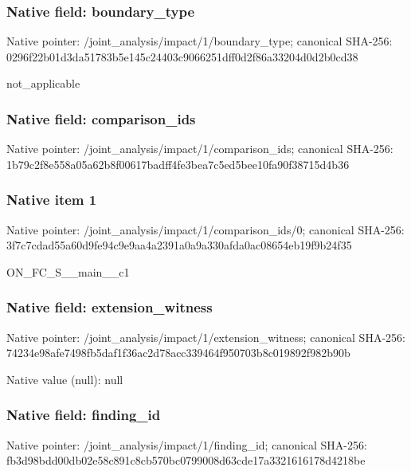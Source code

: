 \documentclass[10pt,a4paper]{article}
\begin{document}
\subsubsection{Native field: boundary\_\allowbreak{}type}
Native pointer: /joint\_\allowbreak{}analysis/impact/1/boundary\_\allowbreak{}type; canonical SHA-256: 0296f22b01d3da51783b5e145c24403c9066251dff0d2f86a33204d0d2b0cd38

\begingroup\raggedright\sloppy not\_\allowbreak{}applicable\par\endgroup

\subsubsection{Native field: comparison\_\allowbreak{}ids}
Native pointer: /joint\_\allowbreak{}analysis/impact/1/comparison\_\allowbreak{}ids; canonical SHA-256: 1b79c2f8e558a05a62b8f00617badff4fe3bea7c5ed5bee10fa90f38715d4b36

\subsubsection{Native item 1}
Native pointer: /joint\_\allowbreak{}analysis/impact/1/comparison\_\allowbreak{}ids/0; canonical SHA-256: 3f7c7cdad55a60d9fe94c9e9aa4a2391a0a9a330afda0ac08654eb19f9b24f35

\begingroup\raggedright\sloppy ON\_\allowbreak{}FC\_\allowbreak{}S\_\allowbreak{}\_\allowbreak{}main\_\allowbreak{}\_\allowbreak{}c1\par\endgroup

\subsubsection{Native field: extension\_\allowbreak{}witness}
Native pointer: /joint\_\allowbreak{}analysis/impact/1/extension\_\allowbreak{}witness; canonical SHA-256: 74234e98afe7498fb5daf1f36ac2d78acc339464f950703b8c019892f982b90b

Native value (null): null

\subsubsection{Native field: finding\_\allowbreak{}id}
Native pointer: /joint\_\allowbreak{}analysis/impact/1/finding\_\allowbreak{}id; canonical SHA-256: fb3d98bdd00db02e58c891c8cb570bc0799008d63cde17a3321616178d4218be
\end{document}
